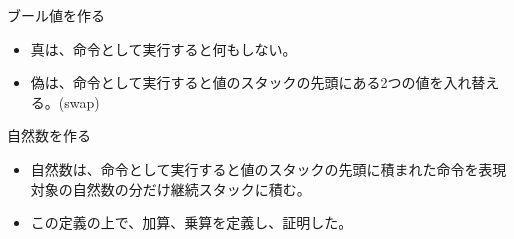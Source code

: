 \documentclass[cjk, 14pt]{beamer}
\begin{document}
\begin{frame}{ブール値を作る}

  \begin{itemize}
    \item 真は、命令として実行すると何もしない。
    \item 偽は、命令として実行すると値のスタックの先頭にある2つの値を入れ替える。(swap)
  \end{itemize}

\end{frame}

\begin{frame}{自然数を作る}

  \begin{itemize}
    \item 自然数は、命令として実行すると値のスタックの先頭に積まれた命令を表現対象の自然数の分だけ継続スタックに積む。
    \item この定義の上で、加算、乗算を定義し、証明した。
  \end{itemize}

\end{frame}
\end{document}
